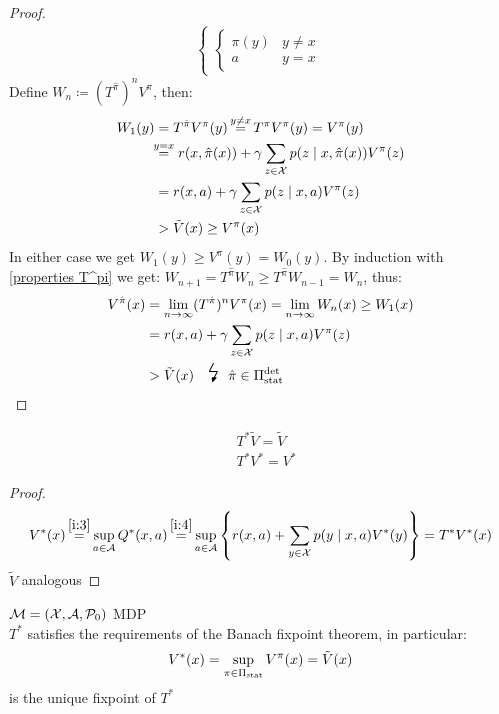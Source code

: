 \begin{proof}
\begin{align*}
\begin{cases}
\begin{cases}
				\pi(y) & y\neq x\\
				a & y=x
			\end{cases}
		\end{cases}
	\end{align*}
	Define \(W_n\coloneqq (T^{\hat{\pi}})^n V^\pi\), then:
	\begin{align*}
		W_1(y)&=T^{\hat{\pi}}V^\pi(y) \xeq{y\neq x} T^\pi V^\pi(y) = V^\pi(y)\\
		&\lxeq{y=x} r(x, \hat{\pi}(x)) 
		+ \gamma \sum_{z\in\cX} p(z \mid x, \hat{\pi}(x)) V^\pi(z)  \\
		&=r(x, a) + \gamma \sum_{z\in\cX} p(z \mid x, a) V^\pi(z) \\
		&> \tilde{V}(x) \ge V^\pi(x)
	\end{align*}
	In either case we get \(W_1(y)\ge V^\pi(y)=W_0(y) \).
	By induction with \ref{properties T^pi} we get: \(W_{n+1}=T^{\hat{\pi}}W_n \ge T^{\hat{\pi}}W_{n-1}=W_n\), thus:
	\begin{align*}
		V^{\hat{\pi}}(x)&=\lim_{n\to\infty}(T^{\hat{\pi}})^n V^\pi(x)=\lim_{n\to\infty} W_n(x)\ge W_1(x) \\
		&=r(x, a) + \gamma \sum_{z\in\cX} p(z \mid x, a) V^\pi(z) \\
		&> \tilde{V}(x) \contradiction{\hat{\pi}\in\detPolicy}
	\end{align*}
\end{proof}


\begin{corollary}
	\begin{align*}
	&T^*\tilde{V}=\tilde{V}\\
	&T^*V^*=V^*
	\end{align*}
\end{corollary}

\begin{proof}
\begin{align*}
	V^*(x)\xeq{\ref{i:3}}\sup_{a\in\cA}Q^*(x,a)\xeq{\ref{i:4}}\sup_{a\in\cA}\left\{r(x,a)+\sum_{y\in\cX}p(y\mid x,a) V^*(y)\right\} =T^*V^*(x)
\end{align*}
\(\tilde{V}\) analogous
\end{proof}


\begin{thm}\(\mathcal{M}=(\mathcal{X},\mathcal{A},\mathcal{P}_0)\) MDP\\
\(T^*\) satisfies the requirements of the Banach fixpoint theorem, in particular:
	\[V^*(x)=\sup_{\pi\in\Pi_{\textnormal{stat}}}V^\pi(x)=\tilde{V}(x) \]
is the unique fixpoint of \(T^*\)
\end{thm}

